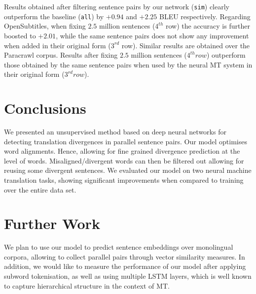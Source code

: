 \documentclass[11pt,a4paper]{article}
\begin{document}
Results obtained after filtering sentence pairs by our network (\texttt{sim}) clearly outperform the baseline (\texttt{all}) by $+0.94$ and $+2.25$ BLEU respectively.
Regarding OpenSubtitles, when fixing $2.5$ million sentences ($4^{th}$ row) the accuracy is further boosted to $+2.01$, while the same sentence pairs does not show any improvement when added in their original form ($3^{rd}$ row).
Similar results are obtained over the Paracrawl corpus. Results after fixing $2.5$ million sentences ($4^{th} row$) outperform those obtained by the same sentence pairs when used by the neural MT system in their original form ($3^{rd} row$).


\section{Conclusions}
\label{conclusions}

We presented an unsupervised method based on deep neural networks for detecting translation divergences in parallel sentence pairs. 
Our model optimises word alignments. Hence, allowing for fine grained divergence prediction at the level of words. 
Misaligned/divergent words can then be filtered out allowing for reusing some divergent sentences. 
We evaluated our model on two neural machine translation tasks, showing significant improvements when compared to training over the entire data set. 

\section{Further Work}
\label{further}

We plan to use our model to predict sentence embeddings over monolingual corpora, allowing to collect parallel pairs through vector similarity measures.
In addition, we would like to measure the performance of our model after applying subword tokenisation,
as well as using multiple LSTM layers, which is well known to capture hierarchical structure in the context of MT.




\end{document}
